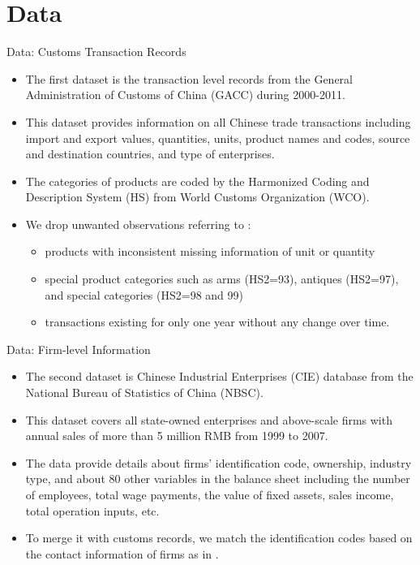 \documentclass[10pt]{beamer}
\begin{document}
\section{Data}

\begin{frame}{Data: Customs Transaction Records}
	\begin{itemize}
		\item The first dataset is the transaction level records from the General Administration of Customs of China (GACC) during 2000-2011.
		\item This dataset provides information on
		all Chinese trade transactions including import and export values, quantities, units, product names and codes, source and destination countries, and type of enterprises.
		\item The categories of products are coded by the Harmonized Coding and Description System (HS) from World Customs Organization (WCO).
		\item We drop unwanted observations referring to \cite{lmx2015}:
		\begin{itemize}
			\item products with inconsistent missing information of unit or quantity
			\item special product categories such as arms (HS2=93), antiques (HS2=97), and special categories (HS2=98 and 99)
			\item transactions existing for only one year without any change over time.
		\end{itemize}
	\end{itemize}
\end{frame}

\begin{frame}{Data: Firm-level Information}
	\begin{itemize}
		\item The second dataset is Chinese Industrial Enterprises (CIE) database from the National Bureau of Statistics of China (NBSC).
		\item This dataset covers all state-owned enterprises and above-scale firms
		with annual sales of more than 5 million RMB from 1999 to 2007.
		\item The data provide details about firms’ identification code, ownership, industry
		type, and about 80 other variables in the balance sheet including the number of employees, total wage payments, the value of fixed assets, sales income, total operation inputs, etc.
		\item To merge it with customs records, we match the identification codes based on the contact information of firms as in \cite{fan-li-yeaple2015}.
	\end{itemize}
\end{frame}
\end{document}
